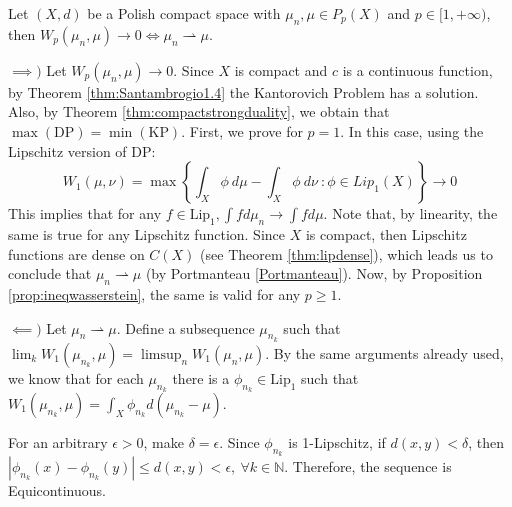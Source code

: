 \begin{theorem}
  Let $(X,d)$ be a Polish compact space with $\mu_n,\mu \in P_p(X)$ and
  $p \in [1,+\infty)$, then $W_p(\mu_n,\mu)\to 0 \iff \mu_n \rightharpoonup \mu$.
  \label{thm:compactwassersteinconv}
\end{theorem}
\begin{prf}

  $\implies)$ Let $W_p(\mu_n,\mu)\to 0$. Since $X$ is compact and $c$ is a continuous function,
  by Theorem \ref{thm:Santambrogio1.4} the Kantorovich Problem has a solution. Also, by Theorem \ref{thm:compactstrongduality},
  we obtain that $\max(\mathrm{DP})=\min(\mathrm{KP})$. First, we prove for $p=1$.
  In this case, using the Lipschitz version of DP:
  \begin{equation*}
    W_1(\mu,\nu)=
    \max \left \{
    \int_X \phi \ d\mu - \int_X \phi \ d\nu \ :
    \phi \in Lip_1(X)
    \right \} \to 0
  \end{equation*}
  This implies that for any $f \in \text{Lip}_1, \int f d\mu_n \to \int f d\mu$. Note that, by linearity,
  the same is true for any Lipschitz function. Since $X$ is compact, then Lipschitz functions are
  dense on $C(X)$ (see Theorem \ref{thm:lipdense}), which leads us to conclude that $\mu_n \rightharpoonup \mu$
  (by Portmanteau \ref{Portmanteau}). Now, by Proposition \ref{prop:ineqwasserstein},
  the same is valid for any $p\geq 1$.

  $\impliedby)$ Let $\mu_n \rightharpoonup \mu$. Define a subsequence $\mu_{n_k}$ such that
  $\lim_k W_1(\mu_{n_k},\mu)=\limsup_n W_1(\mu_n,\mu)$. By the same arguments already used,
  we know that for each $\mu_{n_k}$ there is a $\phi_{n_k} \in \text{Lip}_1$ such that
  $W_1(\mu_{n_k},\mu) = \int_X \phi_{n_k}d(\mu_{n_k}-\mu)$.

  For an arbitrary $\epsilon >0$, make $\delta = \epsilon$. Since $\phi_{n_k}$ is 1-Lipschitz,
  if $d(x,y) < \delta$, then
  $|\phi_{n_k}(x) - \phi_{n_k}(y)| \leq d(x,y) < \epsilon, \ \forall k \in \mathbb N$. Therefore, the sequence is
  Equicontinuous.


\end{prf}

